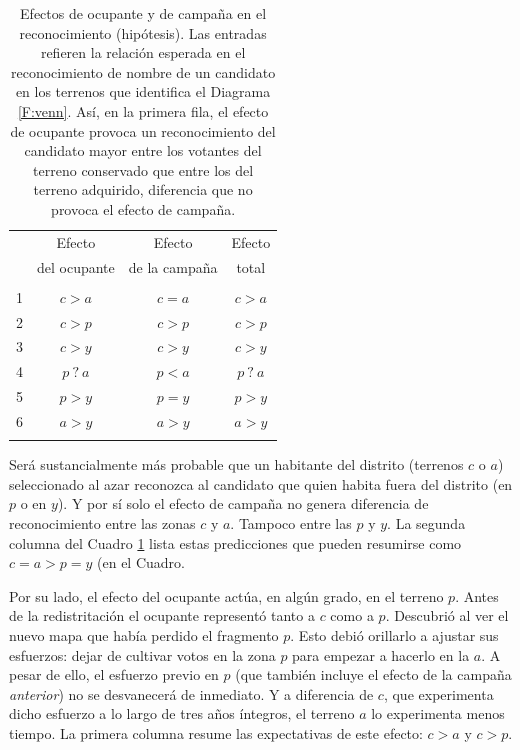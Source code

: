 \documentclass[letter,12pt]{article}
\begin{document}
\begin{table}
  \centering
  \begin{tabular}{cccc}
    & Efecto &       Efecto &        Efecto \\ [-.5ex]
    & del ocupante & de la campaña & total\\ \hline
    \\ [-1.2ex]
    1 & $c>a$   & $c=a$  & $c>a$   \\
    2 & $c>p$   & $c>p$  & $c>p$   \\
    3 & $c>y$   & $c>y$  & $c>y$   \\
    4 & $p~?~a$ & $p<a$  & $p~?~a$ \\
    5 & $p>y$   & $p=y$  & $p>y$   \\
    6 & $a>y$   & $a>y$  & $a>y$   \\ \\ [-1.2ex] \hline 
  \end{tabular}
  \caption{Efectos de ocupante y de campaña en el reconocimiento (hipótesis). Las entradas refieren la relación esperada en el reconocimiento de nombre de un candidato en los terrenos que identifica el Diagrama \ref{F:venn}. Así, en la primera fila, el efecto de ocupante provoca un reconocimiento del candidato mayor entre los votantes del terreno conservado que entre los del terreno adquirido, diferencia que no provoca el efecto de campaña.}\label{T:hyps}
\end{table}

Será sustancialmente más probable que un habitante del distrito (terrenos $c$ o $a$) seleccionado al azar reconozca al candidato que quien habita fuera del distrito (en $p$ o en $y$). Y por sí solo el efecto de campaña no genera diferencia de reconocimiento entre las zonas $c$ y $a$. Tampoco entre las $p$ y $y$. La segunda columna del Cuadro \ref{T:hyps} lista estas predicciones que pueden resumirse como $c=a>p=y$ (en el Cuadro. 

Por su lado, el efecto del ocupante actúa, en algún grado, en el terreno $p$. Antes de la redistritación el ocupante representó tanto a $c$ como a $p$. Descubrió al ver el nuevo mapa que había perdido el fragmento $p$. Esto debió orillarlo a ajustar sus esfuerzos: dejar de cultivar votos en la zona $p$ para empezar a hacerlo en la $a$. A pesar de ello, el esfuerzo previo en $p$ (que también incluye el efecto de la campaña \emph{anterior}) no se desvanecerá de inmediato. Y a diferencia de $c$, que experimenta dicho esfuerzo a lo largo de tres años íntegros, el terreno $a$ lo experimenta menos tiempo. La primera columna resume las expectativas de este efecto: $c>a$ y $c>p$. 
\end{document}
